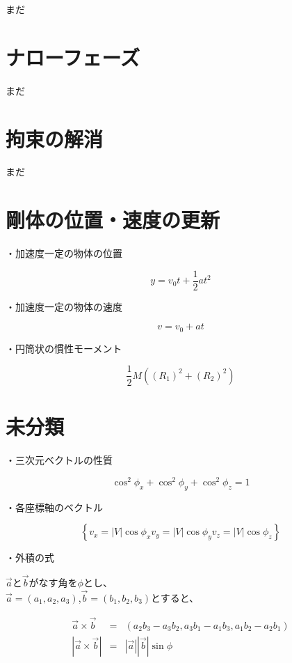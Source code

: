 \documentclass[11pt,aj4]{jarticle}
\begin{document}
まだ

\section{ナローフェーズ}

まだ

\section{拘束の解消}

まだ

\section{剛体の位置・速度の更新}

・加速度一定の物体の位置

\[
    y
    = v_0 t + \frac{1}{2} a t^2
\]

・加速度一定の物体の速度

\[
    v
    = v_0 + a t
\]

・円筒状の慣性モーメント

\[
  \frac{1}{2} M ((R_1)^2 + (R_2)^2)
\]

\section{未分類}

    ・三次元ベクトルの性質

    \[
        \cos^2\phi_x + \cos^2\phi_y + \cos^2\phi_z = 1
    \]

    ・各座標軸のベクトル

    \[
        \left\{
        v_x = |V| \cos\phi_x
        v_y = |V| \cos\phi_y
        v_z = |V| \cos\phi_z
        \right\}
    \]

    ・外積の式

    $\vec{a}$と$\vec{b}$がなす角を$\phi$とし、\\
    $\vec{a} = (a_1, a_2, a_3)$,$\vec{b} = (b_1, b_2, b_3)$とすると、

    \[
        \begin{split}
        \vec{a} \times \vec{b}
        &=& (a_2 b_3 - a_3 b_2, a_3 b_1 - a_1 b_3, a_1 b_2 - a_2 b_1) \\

        |\vec{a} \times \vec{b}|
        &=& |\vec{a}||\vec{b}| \sin \phi
            \end{split}
    \]
\end{document}
